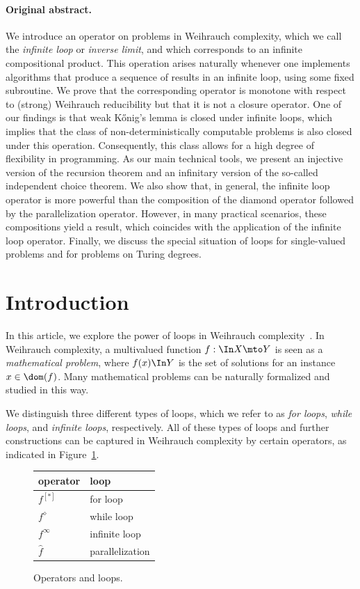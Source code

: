 \paragraph{Original abstract.} 
We introduce an operator on problems in Weihrauch complexity, which we call the {\em infinite loop} or {\em inverse limit}, and which
 corresponds to an infinite compositional product.
This operation arises naturally whenever one implements algorithms that produce a sequence of results 
in an infinite loop, using some fixed subroutine.
We prove that the corresponding operator is monotone with respect to (strong) Weihrauch reducibility but that
it is not a closure operator. 
One of our findings is that weak K\H{o}nig's lemma is closed under infinite loops, which implies that the
class of non-deterministically computable problems is also closed under this operation.
Consequently, this class allows for a high degree of flexibility in programming.
As our main technical tools, we present an injective version of the recursion theorem
and an infinitary version of the so-called independent choice theorem.
We also show that, in general, the infinite loop operator is more powerful than the composition of 
 the diamond operator followed by the parallelization operator. However,  in many practical scenarios,
these compositions yield a result, which coincides with the application of the infinite loop operator.
Finally, we discuss the special situation of loops for single-valued problems and for problems on Turing degrees.


\section{Introduction}

In this article, we explore the power of loops in Weihrauch complexity~\cite{BGP21}.
In Weihrauch complexity, a multivalued function $f:\In X\mto Y$ is seen as a {\em mathematical problem},
where $f(x)\In Y$ is the set of solutions for an instance $x\in\dom(f)$.
Many mathematical problems can be naturally formalized and studied in this way.

We distinguish three different types of loops, which we refer to as {\em for loops}, {\em while loops}, and {\em infinite loops},
respectively. All of these types of loops and further constructions 
can be captured in Weihrauch complexity by certain operators, as indicated
in Figure~\ref{fig:operators-loops}.

\begin{figure}[h]
	\centering
	\begin{tabular}{l|l}
		{\bf operator} & {\bf loop}\\\hline
		$f^{[*]}$ & for loop\\
		$f^\diamond$ & while loop\\
		$f^\infty$ & infinite loop\\
		$\widehat{f}$ & parallelization
	\end{tabular}
	\caption{Operators and loops.}
	\label{fig:operators-loops}
\end{figure}

